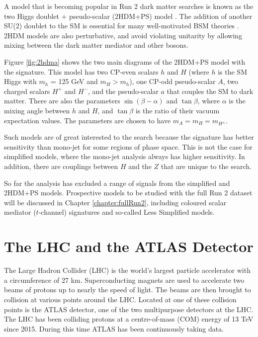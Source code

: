 A model that is becoming popular in Run 2 \monoX dark matter searches is known as the two Higgs doublet + pseudo-scalar (2HDM+PS) model \cite{Bauer:2017ota}. The addition of another SU(2) doublet to the SM is essential for many well-motivated BSM theories \cite{Branco:2011iw}. 2HDM models are also perturbative, and avoid violating unitarity by allowing mixing between the dark matter mediator and other bosons. 

Figure \ref{fig:2hdma} shows the two main diagrams of the 2HDM+PS model with the \monoZ signature. This model has two CP-even scalars $h$ and $H$ (where $h$ is the SM Higgs with $m_h$ = 125 GeV and $m_H > m_h$), one CP-odd pseudo-scalar $A$, two charged scalars $H^+$ and $H^-$, and the pseudo-scalar $a$ that couples the SM to dark matter. There are also the parameters $\sin(\beta-\alpha)$ and $\tan \beta$, where $\alpha$ is the mixing angle between $h$ and $H$, and $\tan \beta$ is the ratio of their vacuum expectation values. The parameters are chosen to have $m_A = m_H = m_{H^\pm}$.

Such models are of great interested to the \monoZ search because the \monoZ signature has better sensitivity than mono-jet for some regions of phase space. This is not the case for simplified models, where the mono-jet analysis always has higher sensitivity. In addition, there are couplings between $H$ and the $Z$ that are unique to the \monoZ search.

So far the \monoZ analysis has excluded a range of signals from the simplified and 2HDM+PS models. Prospective models to be studied with the full Run 2 dataset will be discussed in Chapter \ref{chapter:fullRun2}, including coloured scalar mediator ($t$-channel) signatures and so-called Less Simplified models.

\clearpage

\section{The LHC and the ATLAS Detector}

The Large Hadron Collider (LHC) is the world's largest particle accelerator with a circumference of 27 km. Superconducting magnets are used to accelerate two beams of protons up to nearly the speed of light. The beams are then brought to collision at various points around the LHC. Located at one of these collision points is the ATLAS detector, one of the two multipurpose detectors at the LHC. The LHC has been colliding protons at a centre-of-mass (COM) energy of 13 TeV since 2015. During this time ATLAS has been continuously taking data.

